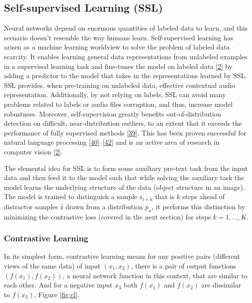 \documentclass[
  a4paper,
]{article}
\begin{document}
\hypertarget{self-supervised-learning-ssl}{%
\subsection{Self-supervised Learning
(SSL)}\label{self-supervised-learning-ssl}}

Neural networks depend on enormous quantities of labeled data to learn,
and this scenario doesn't resemble the way humans learn. Self-supervised
learning has arisen as a machine learning worldview to solve the problem
of labeled data scarcity. It enables learning general data
representations from unlabeled examples in a supervised learning task
and fine-tunes the model on labeled data
\protect\hyperlink{ref-2020arXiv200611477B}{{[}2{]}} by adding a
predictor to the model that takes in the representations learned by SSL.
SSL provides, when pre-training on unlabeled data, effective contextual
audio representation. Additionally, by not relying on labels, SSL can
avoid many problems related to labels or audio files corruption, and
thus, increase model robustness. Moreover, self-supervision greatly
benefits out-of-distribution detection on difficult, near-distribution
outliers, to an extent that it exceeds the performance of fully
supervised methods
\protect\hyperlink{ref-2019arXiv190612340H}{{[}39{]}}. This has been
proven successful for natural language processing
\protect\hyperlink{ref-peters2018deep}{{[}40{]}}--\protect\hyperlink{ref-devlin2019bert}{{[}42{]}}
and is an active area of research in computer vision
\protect\hyperlink{ref-2020arXiv200611477B}{{[}2{]}}.

The elemental idea for SSL is to form some auxiliary pre-text task from
the input data and then feed it to the model such that while solving the
auxiliary task the model learns the underlying structure of the data
(object structure in an image). The model is trained to distinguish a
sample \(\mathrm{z}_{i+k}\) that is \(k\) steps ahead of distractor
samples \(\hat{\mathrm{z}}\) drawn from a distribution \(p_n\), it
performs this distinction by minimizing the contrastive loss (covered in
the next section) for steps \(k = 1,...,K\).

\subsubsection{Contrastive Learning}  
\label{section:cl}

In its simplest form, contrastive learning means for any positive pairs
(different views of the same data) of input \((x_1, x_2)\), there is a
pair of output functions \((f(x_1), f(x_2))\), a neural network function
in this context, that are similar to each other. And for a negative
input \(x_3\) both \(f(x_1)\) and \(f(x_2)\) are dissimilar to
\(f(x_3)\), Figure \ref{fig:cl}.
\end{document}
